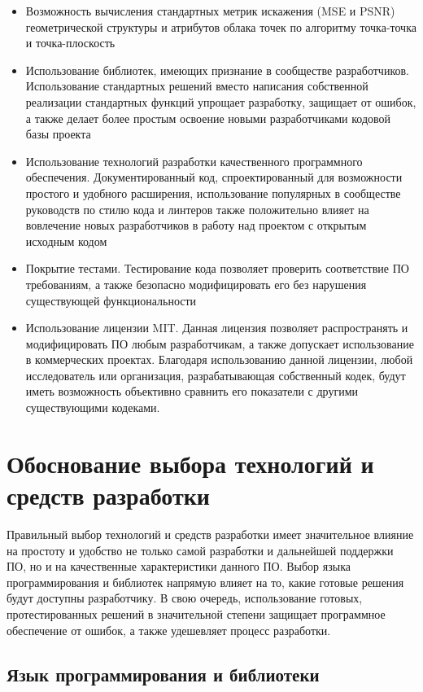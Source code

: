 \begin{itemize}
    \item Возможность вычисления стандартных метрик искажения (MSE и PSNR)
    геометрической структуры и атрибутов облака точек по алгоритму точка-точка и
    точка-плоскость
    \item Использование библиотек, имеющих признание в сообществе разработчиков.
    Использование стандартных решений вместо написания собственной реализации
    стандартных функций упрощает разработку, защищает от ошибок, а также делает
    более простым освоение новыми разработчиками кодовой базы проекта
    \item Использование технологий разработки качественного программного
    обеспечения. Документированный код, спроектированный для возможности
    простого и удобного расширения, использование популярных в сообществе
    руководств по стилю кода и линтеров также положительно влияет на вовлечение
    новых разработчиков в работу над проектом с открытым исходным кодом
    \item Покрытие тестами. Тестирование кода позволяет проверить соответствие
    ПО требованиям, а также безопасно модифицировать его без нарушения
    существующей функциональности
    \item Использование лицензии MIT. Данная лицензия позволяет распространять и
    модифицировать ПО любым разработчикам, а также допускает использование в
    коммерческих проектах. Благодаря использованию данной лицензии, любой
    исследователь или организация, разрабатывающая собственный кодек, будут
    иметь возможность объективно сравнить его показатели с другими существующими
    кодеками.
\end{itemize}

\newpage
\chapter{Обоснование выбора технологий и средств разработки}

Правильный выбор технологий и средств разработки имеет значительное влияние на
простоту и удобство не только самой разработки и дальнейшей поддержки ПО, но и
на качественные характеристики данного ПО. Выбор языка программирования и
библиотек напрямую влияет на то, какие готовые решения будут доступны
разработчику. В свою очередь, использование готовых, протестированных решений в
значительной степени защищает программное обеспечение от ошибок, а также
удешевляет процесс разработки.

\section{Язык программирования и библиотеки}

